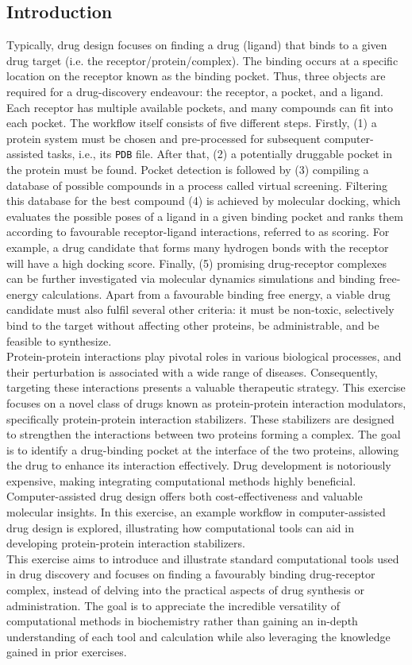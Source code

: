 \documentclass[9pt,tutorial]{livecoms}
\begin{document}
\subsection*{Introduction}
Typically, drug design focuses on finding a drug (ligand) that binds to a given drug target (i.e. the receptor/protein/complex). The binding occurs at a specific location on the receptor known as the binding pocket. Thus, three objects are required for a drug-discovery endeavour: the receptor, a pocket, and a ligand. Each receptor has multiple available pockets, and many compounds can fit into each pocket. The workflow itself consists of five different steps. Firstly, (1) a protein system must be chosen and pre-processed for subsequent computer-assisted tasks, i.e., its \texttt{PDB} file. After that, (2) a potentially druggable pocket in the protein must be found. Pocket detection is followed by (3) compiling a database of possible compounds in a process called virtual screening. Filtering this database for the best compound (4) is achieved by molecular docking, which evaluates the possible poses of a ligand in a given binding pocket and ranks them according to favourable receptor-ligand interactions, referred to as scoring. For example, a drug candidate that forms many hydrogen bonds with the receptor will have a high docking score. Finally, (5) promising drug-receptor complexes can be further investigated via molecular dynamics simulations and binding free-energy calculations. Apart from a favourable binding free energy, a viable drug candidate must also fulfil several other criteria: it must be non-toxic, selectively bind to the target without affecting other proteins, be administrable, and be feasible to synthesize.\\ 
Protein-protein interactions play pivotal roles in various biological processes, and their perturbation is associated with a wide range of diseases. Consequently, targeting these interactions presents a valuable therapeutic strategy. This exercise focuses on a novel class of drugs known as protein-protein interaction modulators, specifically protein-protein interaction stabilizers. These stabilizers are designed to strengthen the interactions between two proteins forming a complex. The goal is to identify a drug-binding pocket at the interface of the two proteins, allowing the drug to enhance its interaction effectively. Drug development is notoriously expensive, making integrating computational methods highly beneficial. Computer-assisted drug design offers both cost-effectiveness and valuable molecular insights. In this exercise, an example workflow in computer-assisted drug design is explored, illustrating how computational tools can aid in developing protein-protein interaction stabilizers.\\
This exercise aims to introduce and illustrate standard computational tools used in drug discovery and focuses on finding a favourably binding drug-receptor complex, instead of delving into the practical aspects of drug synthesis or administration. The goal is to appreciate the incredible versatility of computational methods in biochemistry rather than gaining an in-depth understanding of each tool and calculation while also leveraging the knowledge gained in prior exercises.
\end{document}
